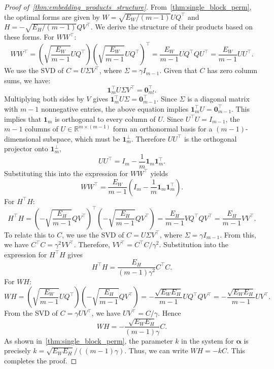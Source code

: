 \documentclass[11pt]{article}
\begin{document}
\begin{proof}[Proof of~\cref{thm:embedding_products_structure}]
From~\cref{thm:single_block_perm}, the optimal forms are given by \( W = \sqrt{E_W/(m-1)} U Q^\top \) and \( H = -\sqrt{E_H/(m-1)} Q V^\top \). We derive the structure of their products based on these forms.
For \(WW^\top\):
\[
WW^\top = \left( \sqrt{\frac{E_W}{m-1}} U Q^\top \right) \left( \sqrt{\frac{E_W}{m-1}} U Q^\top \right)^\top = \frac{E_W}{m-1} U Q^\top Q U^\top = \frac{E_W}{m-1} U U^\top. \]
We use the SVD of \(C = U\Sigma V^\top\), where \(\Sigma = \gamma I_{m-1}\). Given that \( C \) has zero column sums, we have:
    \[
    \boldsymbol{1}_m^\top U \Sigma V^\top = \boldsymbol{0}_{m!}^\top.
    \]
    Multiplying both sides by \( V \) gives \( \boldsymbol{1}_m^\top U \Sigma = \boldsymbol{0}_{m-1}^\top \).
    Since \( \Sigma \) is a diagonal matrix with \( m-1 \) nonnegative entries, the above equation implies
    \( \boldsymbol{1}_m^\top U = \boldsymbol{0}_{m-1}^\top \).
This implies that \(\boldsymbol{1}_m\) is orthogonal to every column of \(U\). Since \(U^\top U=I_{m-1}\), the \(m-1\) columns of \(U\in\mathbb{R}^{m\times(m-1)}\) form an orthonormal basis for a \((m-1)\)-dimensional subspace, which must be \(\boldsymbol{1}_m^\perp\). Therefore \(UU^\top\) is the orthogonal projector onto \(\boldsymbol{1}_m^\perp\), 
    \[
    UU^\top = I_m - \frac{1}{m} \boldsymbol{1}_m \boldsymbol{1}_m^\top.
    \]
Substituting this into the expression for \( WW^\top \) yields
\[
WW^\top = \frac{E_W}{m-1} \left( I_m - \frac{1}{m} \boldsymbol{1}_m \boldsymbol{1}_m^\top \right ).
\]
For \(H^\top H\):
\[
H^\top H = \left( -\sqrt{\frac{E_H}{m-1}} Q V^\top \right)^\top \left( -\sqrt{\frac{E_H}{m-1}} Q V^\top \right) = \frac{E_H}{m-1} V Q^\top Q V^\top = \frac{E_H}{m-1} VV^\top.
\]
To relate this to \(C\), we use the SVD of \(C = U\Sigma V^\top\), where \(\Sigma = \gamma I_{m-1}\). From this, we have \(C^\top C = \gamma^2 VV^\top\).
Therefore, \(VV^\top = C^\top C/\gamma^2\). Substitution into the expression for \(H^\top H\) gives
\[ H^\top H = \frac{E_H}{(m-1)\gamma^2} C^\top C. \]
For \( WH \):
\[
WH = \left( \sqrt{\frac{E_W}{m-1}} U Q^\top \right ) \left( -\sqrt{\frac{E_H}{m-1}} Q V^\top \right ) = -\frac{\sqrt{E_W E_H}}{m-1} U Q^\top Q V^\top = -\frac{\sqrt{E_W E_H}}{m-1} U V^\top.
\]
From the SVD of \(C = \gamma U V^\top\), we have \( UV^\top = C/\gamma \). Hence
\[
WH = -\frac{\sqrt{E_W E_H}}{(m-1)\gamma} C.
\]
As shown in~\cref{thm:single_block_perm}, the parameter \(k\) in the system for \(\boldsymbol{\alpha}\) is precisely \(k = \sqrt{E_W E_H}/((m-1)\gamma)\). Thus, we can write \(WH = -kC\).
This completes the proof.
\end{proof}
\end{document}

